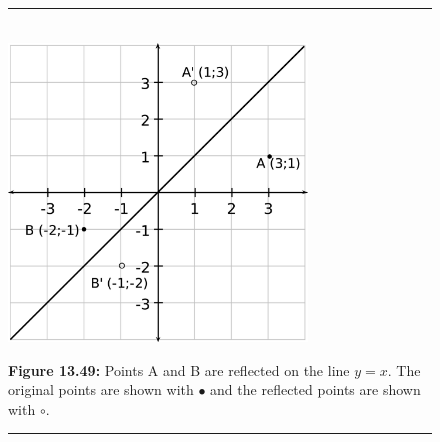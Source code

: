 	\begin{figure}[H] %
    \begin{center}
    \rule[.1in]{\figurerulewidth}{.005in} \\
        \label{m39358*uid7568!!!underscore!!!media}\label{m39358*uid7568!!!underscore!!!printimage}\includegraphics[width=300px]{col11306.imgs/m39358_MG10C14_030.png} %
        
      \vspace{2pt}
    \vspace{\rubberspace}\par \begin{cnxcaption}
	  \small \textbf{Figure 13.49: }Points A and B are reflected on the line $y=x$. The original points are shown with \begin{math}\ensuremath{\bullet}\end{math} and the reflected points are shown with \begin{math}\circ \end{math}.
	\end{cnxcaption}
      
    \vspace{.1in}
    \rule[.1in]{\figurerulewidth}{.005in} \\
        
    \end{center}

 \end{figure}   

    \addtocounter{footnote}{-0}
    
